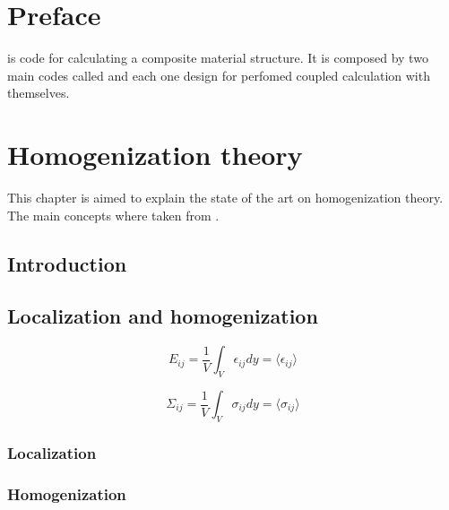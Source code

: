 \chapter{Preface}

\par
\sputnik is code for calculating a composite material structure. It is composed by two main codes called \macro and
\micro each one design for perfomed coupled calculation with themselves.

\chapter{Homogenization theory}
This chapter is aimed to explain the state of the art on homogenization theory. The main concepts where taken from
\cite{suquet_1985}.

\section{Introduction}

\begin{figure}[h!]
\resizebox{2cm}{!}{
 
}
\end{figure}

\begin{figure}[h!]
\resizebox{5cm}{!}{
 
}
\end{figure}


\section{Localization and homogenization}

\begin{equation}
E_{ij} = \frac{1}{V}\int_{V}\epsilon_{ij}dy = \langle \epsilon_{ij} \rangle
\end{equation}

\begin{equation}
\Sigma_{ij} = \frac{1}{V}\int_{V}\sigma_{ij}dy = \langle \sigma_{ij} \rangle
\end{equation}

\subsection{Localization}


\subsection{Homogenization}



